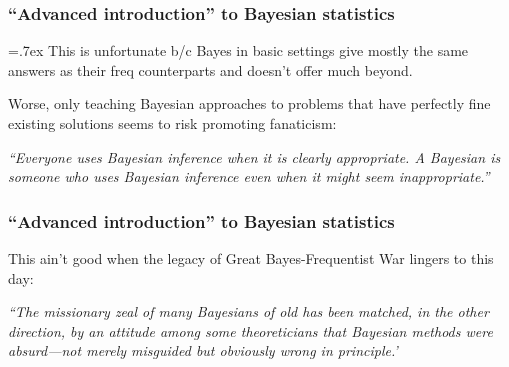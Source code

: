 \documentclass[18pt]{beamer}
\begin{document}
\begin{frame}
\frametitle{``Advanced introduction'' to Bayesian statistics}

{\font=.7ex 
This is unfortunate b/c Bayes in basic settings give mostly the same answers as their freq counterparts and doesn't offer much beyond.} 

\pause
\smallskip
Worse, only teaching Bayesian approaches to problems that have perfectly fine existing solutions seems to risk promoting fanaticism:

\begin{center}
\begin{minipage}{.93\linewidth}
{\slshape
``Everyone uses Bayesian inference when it is clearly appropriate. A Bayesian is someone who uses Bayesian inference even when it might seem inappropriate.''}

\hfill \citep{gelman2013bayes_absurdity}
\end{minipage}
\end{center}

\end{frame}


\begin{frame}
\frametitle{``Advanced introduction'' to Bayesian statistics}

This ain't good when the legacy of Great Bayes-Frequentist War lingers to this day:

\begin{center}
\begin{minipage}{.87\linewidth}
{\slshape
``The missionary zeal of many Bayesians of old has been matched, in the other direction, by an attitude among some theoreticians that Bayesian methods were absurd—not merely misguided but obviously wrong in principle.'}

\vspace*{.3\baselineskip}
\hfill \citep{gelman2013bayes_absurdity}
\end{minipage}
\end{center}

\end{frame}
\end{document}
